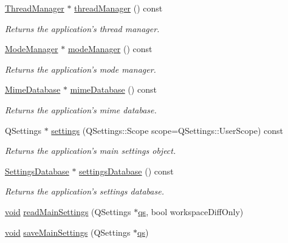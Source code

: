 \begin{DoxyCompactItemize}
\hyperlink{class_core_1_1_thread_manager}{Thread\-Manager} $\ast$ \hyperlink{group___core_plugin_ga1470c6f48fe51c11e5ac124ab6163e98}{thread\-Manager} () const 
\begin{DoxyCompactList}\small\item\em Returns the application's thread manager. \end{DoxyCompactList}\item 
\hyperlink{class_core_1_1_mode_manager}{Mode\-Manager} $\ast$ \hyperlink{group___core_plugin_ga44ed1e705d67281a9f15bf01533170ec}{mode\-Manager} () const 
\begin{DoxyCompactList}\small\item\em Returns the application's mode manager. \end{DoxyCompactList}\item 
\hyperlink{class_core_1_1_mime_database}{Mime\-Database} $\ast$ \hyperlink{group___core_plugin_ga95eea00c6e3a6ddfa8c30bfb6235068e}{mime\-Database} () const 
\begin{DoxyCompactList}\small\item\em Returns the application's mime database. \end{DoxyCompactList}\item 
Q\-Settings $\ast$ \hyperlink{group___core_plugin_ga478630bd5faf6a57e817f6f6391a3780}{settings} (Q\-Settings\-::\-Scope scope=Q\-Settings\-::\-User\-Scope) const 
\begin{DoxyCompactList}\small\item\em Returns the application's main settings object. \end{DoxyCompactList}\item 
\hyperlink{class_core_1_1_settings_database}{Settings\-Database} $\ast$ \hyperlink{group___core_plugin_ga71a160a5db09558d4629b0b9c185a773}{settings\-Database} () const 
\begin{DoxyCompactList}\small\item\em Returns the application's settings database. \end{DoxyCompactList}\item 
\hyperlink{group___u_a_v_objects_plugin_ga444cf2ff3f0ecbe028adce838d373f5c}{void} \hyperlink{group___core_plugin_ga5b6aedac3eba640d03e579135c0e2b6d}{read\-Main\-Settings} (Q\-Settings $\ast$\hyperlink{analyze_i_n_s_g_p_s_8m_a620a138c8981e0536c569d7761df4548}{qs}, bool workspace\-Diff\-Only)
\item 
\hyperlink{group___u_a_v_objects_plugin_ga444cf2ff3f0ecbe028adce838d373f5c}{void} \hyperlink{group___core_plugin_ga491739a4473f47efb06633f80e1eb8c3}{save\-Main\-Settings} (Q\-Settings $\ast$\hyperlink{analyze_i_n_s_g_p_s_8m_a620a138c8981e0536c569d7761df4548}{qs})

\end{DoxyCompactItemize}
